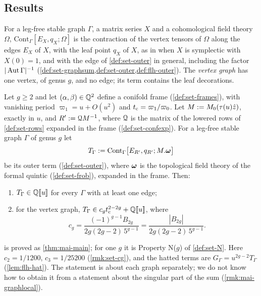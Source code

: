 
\subsection{Results}
\label{sec:int-results}

For a leg-free stable graph $\Gamma$, a matrix series $X$ and a cohomological field theory $\Omega$, $\mathrm{Cont}_\Gamma[E_X,q_X;\Omega]$ is the contraction of the vertex tensors of $\Omega$ along the edges $E_X$ of $X$, with the leaf point $q_X$ of $X$, as in \cite[Defs.~2.2, 2.13]{PPZ15} when $X$ is symplectic with $X(0)=1$, and with the edge of \cref{def:set-outer} in general, including the factor $|\operatorname{Aut}\Gamma|^{-1}$ (\cref{def:set-graphsum,def:set-outer,def:flh-outer}). The \emph{vertex graph} has one vertex, of genus $g$, and no edge; its term contains the leaf decorations.

\begin{thm}[Theorem~A]
\label{thm:int-main}
Let $g\geq2$ and let $(\alpha,\beta)\in\mathbb{Q}^2$ define a conifold frame (\cref{def:set-frames}), with vanishing period $\varpi_1=u+O(u^2)$ and $t_{\mathrm{c}}=\varpi_1/\varpi_0$. Let $M:=M_{0}(\tau(u)\hat{z})$, exactly in $u$, and $R':=\mathcal{Q} M^{-1}$, where $\mathcal{Q}$ is the matrix of the lowered rows of \cref{def:set-rows} expanded in the frame (\cref{def:set-confexp}). For a leg-free stable graph $\Gamma$ of genus $g$ let
\[
T_\Gamma:=\mathrm{Cont}_\Gamma\bigl[E_{R'},q_{R'};M.\boldsymbol{\omega}\bigr]
\]
be its outer term (\cref{def:set-outer}), where $\boldsymbol{\omega}$ is the topological field theory of the formal quintic (\cref{def:set-frob}), expanded in the frame. Then:
\begin{enumerate}
\item $T_\Gamma\in\mathbb{Q}[\![ u ]\!]$ for every $\Gamma$ with at least one edge;
\item for the vertex graph, $T_\Gamma\in c_gt_{\mathrm{c}}^{2-2g}+\mathbb{Q}[\![ u ]\!]$, where
\[
c_g=\frac{(-1)^{g-1}B_{2g}}{2g(2g-2)\,5^{g-1}}=\frac{|B_{2g}|}{2g(2g-2)\,5^{g-1}} .
\]
\end{enumerate}
\end{thm}

 is proved as \cref{thm:mai-main}; for one $g$ it is Property N($g$) of \cref{def:set-N}. Here $c_2=1/1200$, $c_3=1/25200$ (\cref{rmk:set-cg}), and the hatted terms are $G_\Gamma=u^{2g-2}T_\Gamma$ (\cref{lem:flh-hat}). The statement is about each graph separately; we do not know how to obtain it from a statement about the singular part of the sum (\cref{rmk:mai-graphlocal}).

